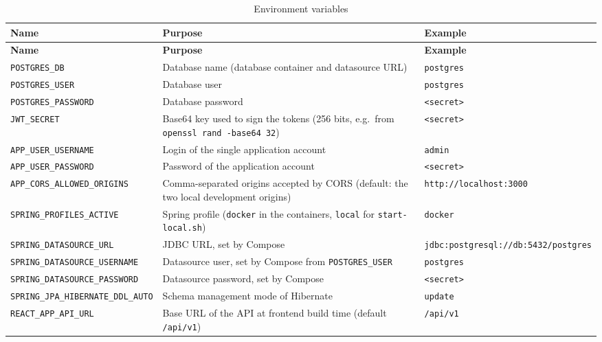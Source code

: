 {\small
\renewcommand{\arraystretch}{1.15}
\begin{longtable}{@{}>{\raggedright\arraybackslash}p{4.9cm} >{\raggedright\arraybackslash}p{5.2cm} >{\raggedright\arraybackslash}p{3.5cm}@{}}
\caption{Environment variables}\label{tab:envvars}\\
\toprule
\textbf{Name} & \textbf{Purpose} & \textbf{Example} \\
\midrule
\endfirsthead
\toprule
\textbf{Name} & \textbf{Purpose} & \textbf{Example} \\
\midrule
\endhead
\bottomrule
\endfoot
\texttt{POSTGRES\_\allowbreak DB} & Database name (database container and datasource URL) & \texttt{postgres} \\
\texttt{POSTGRES\_\allowbreak USER} & Database user & \texttt{postgres} \\
\texttt{POSTGRES\_\allowbreak PASSWORD} & Database password & \texttt{<secret>} \\
\texttt{JWT\_\allowbreak SECRET} & Base64 key used to sign the tokens (256 bits, e.g.\ from \texttt{openssl rand -base64 32}) & \texttt{<secret>} \\
\texttt{APP\_\allowbreak USER\_\allowbreak USERNAME} & Login of the single application account & \texttt{admin} \\
\texttt{APP\_\allowbreak USER\_\allowbreak PASSWORD} & Password of the application account & \texttt{<secret>} \\
\texttt{APP\_\allowbreak CORS\_\allowbreak ALLOWED\_\allowbreak ORIGINS} & Comma-separated origins accepted by CORS (default: the two local development origins) & \texttt{http:/\allowbreak /localhost:3000} \\
\midrule
\texttt{SPRING\_\allowbreak PROFILES\_\allowbreak ACTIVE} & Spring profile (\texttt{docker} in the containers, \texttt{local} for \texttt{start-local.sh}) & \texttt{docker} \\
\texttt{SPRING\_\allowbreak DATASOURCE\_\allowbreak URL} & JDBC URL, set by Compose & \texttt{jdbc:postgresql:/\allowbreak /db:5432/\allowbreak postgres} \\
\texttt{SPRING\_\allowbreak DATASOURCE\_\allowbreak USERNAME} & Datasource user, set by Compose from \texttt{POSTGRES\_\allowbreak USER} & \texttt{postgres} \\
\texttt{SPRING\_\allowbreak DATASOURCE\_\allowbreak PASSWORD} & Datasource password, set by Compose & \texttt{<secret>} \\
\texttt{SPRING\_\allowbreak JPA\_\allowbreak HIBERNATE\_\allowbreak DDL\_\allowbreak AUTO} & Schema management mode of Hibernate & \texttt{update} \\
\texttt{REACT\_\allowbreak APP\_\allowbreak API\_\allowbreak URL} & Base URL of the API at frontend build time (default \texttt{/api/v1}) & \texttt{/api/v1} \\
\end{longtable}
}


